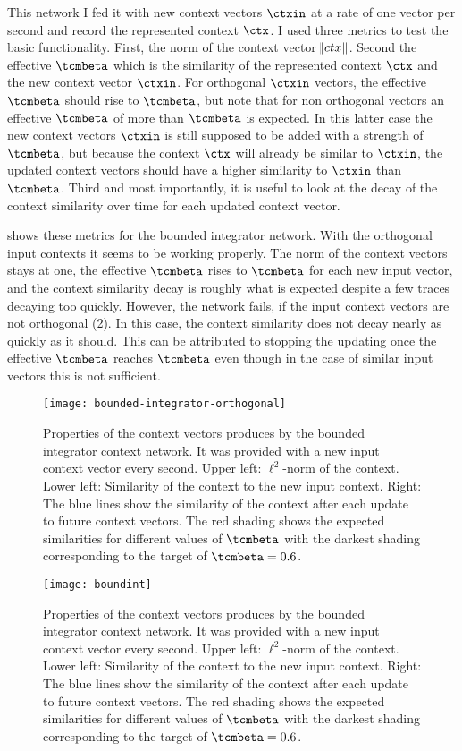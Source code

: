 This network I fed it with new context vectors $\ctxin$ at a rate of one vector per second and record the represented context $\ctx$.
I used three metrics to test the basic functionality. First, the norm of the context vector $\norm{ctx}$.
Second the effective $\tcmbeta$ which is the similarity of the represented context $\ctx$ and the new context vector $\ctxin$.
For orthogonal $\ctxin$ vectors, the effective $\tcmbeta$ should rise to $\tcmbeta$, but note that for non orthogonal vectors an effective $\tcmbeta$ of more than $\tcmbeta$ is expected.
In this latter case the new context vectors $\ctxin$ is still supposed to be added with a strength of $\tcmbeta$, but because the context $\ctx$ will already be similar to $\ctxin$, the updated context vectors should have a higher similarity to $\ctxin$ than $\tcmbeta$.
Third and most importantly, it is useful to look at the decay of the context similarity over time for each updated context vector.

 shows these metrics for the bounded integrator network. With the orthogonal input contexts it seems to be working properly.
The norm of the context vectors stays at one, the effective $\tcmbeta$ rises to $\tcmbeta$ for each new input vector, and the context similarity decay is roughly what is expected despite a few traces decaying too quickly.
However, the network fails, if the input context vectors are not orthogonal (\cref{fig:boundint}).
In this case, the context similarity does not decay nearly as quickly as it should.
This can be attributed to stopping the updating once the effective $\tcmbeta$ reaches $\tcmbeta$ even though in the case of similar input vectors this is not sufficient.
\begin{figure}
    \centering
    \texttt{[image: bounded-integrator-orthogonal]}
    \caption{
        Properties of the context vectors produces by the bounded integrator context network.
        It was provided with a new input context vector every second.
        Upper left: $\ell^2$-norm of the context.
        Lower left: Similarity of the context to the new input context.
        Right: The blue lines show the similarity of the context after each update to future context vectors.
        The red shading shows the expected similarities for different values of $\tcmbeta$ with the darkest shading corresponding to the target of $\tcmbeta = 0.6$.}\label{fig:bounded-integrator-orthogonal}
\end{figure}
\begin{figure}
    \centering
    \texttt{[image: boundint]}
    \caption{
        Properties of the context vectors produces by the bounded integrator context network.
        It was provided with a new input context vector every second.
        Upper left: $\ell^2$-norm of the context.
        Lower left: Similarity of the context to the new input context.
        Right: The blue lines show the similarity of the context after each update to future context vectors.
        The red shading shows the expected similarities for different values of $\tcmbeta$ with the darkest shading corresponding to the target of $\tcmbeta = 0.6$.}\label{fig:boundint}
\end{figure}

